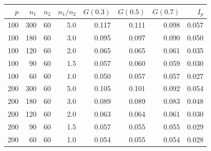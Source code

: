 \begin{tabular}{@{}rrrrrrrr@{}}
\toprule
$p$ & $n_1$ & $n_2$ & $n_1/n_2$ & $G(0.3)$ & $G(0.5)$ & $G(0.7)$ & $I_p$ \\
\midrule
100 & 300 & 60 & 5.0 & 0.117 & 0.111 & 0.098 & 0.057 \\
100 & 180 & 60 & 3.0 & 0.095 & 0.097 & 0.090 & 0.050 \\
100 & 120 & 60 & 2.0 & 0.065 & 0.065 & 0.061 & 0.035 \\
100 & 90 & 60 & 1.5 & 0.057 & 0.060 & 0.059 & 0.030 \\
100 & 60 & 60 & 1.0 & 0.050 & 0.057 & 0.057 & 0.027 \\
\midrule
200 & 300 & 60 & 5.0 & 0.105 & 0.101 & 0.092 & 0.054 \\
200 & 180 & 60 & 3.0 & 0.089 & 0.089 & 0.083 & 0.048 \\
200 & 120 & 60 & 2.0 & 0.063 & 0.064 & 0.061 & 0.030 \\
200 & 90 & 60 & 1.5 & 0.057 & 0.055 & 0.055 & 0.029 \\
200 & 60 & 60 & 1.0 & 0.054 & 0.055 & 0.054 & 0.028 \\
\bottomrule
\end{tabular}
